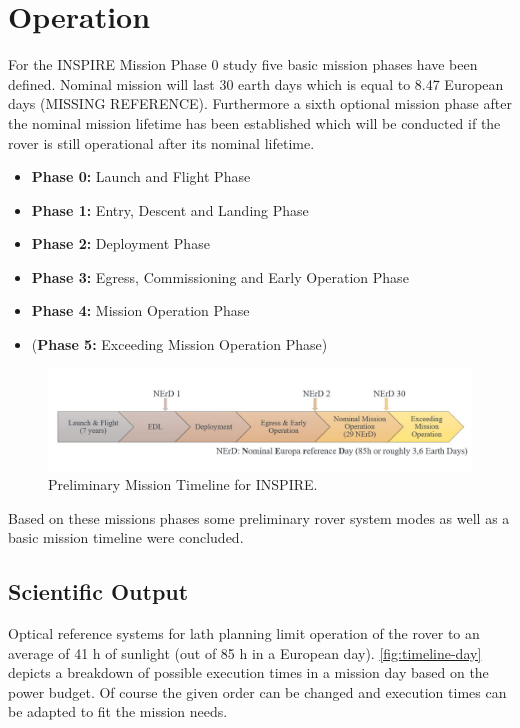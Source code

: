 \chapter{Operation}
\label{chap:Operation}

For the INSPIRE Mission Phase 0 study five basic mission phases have been defined. Nominal mission will last 30 earth days which is equal to 8.47 European days (MISSING REFERENCE). Furthermore a sixth optional mission phase after the nominal mission lifetime has been established which will be conducted if the rover is still operational after its nominal lifetime.

\begin{itemize}
\itemsep0pt
\item	\textbf{Phase 0:} Launch and Flight Phase
\item	\textbf{Phase 1:} Entry, Descent and Landing Phase
\item	\textbf{Phase 2:} Deployment Phase
\item	\textbf{Phase 3:} Egress, Commissioning and Early Operation Phase
\item	\textbf{Phase 4:} Mission Operation Phase
\item	(\textbf{Phase 5:} Exceeding Mission Operation Phase) 
\end{itemize}

\begin{figure}[H]
{\centering
\includegraphics[width=1.0\textwidth]{Media/timeline}
\caption{Preliminary Mission Timeline for INSPIRE.}
\label{fig:timeline}
}
\end{figure}

Based on these missions phases some preliminary rover system modes as well as a basic mission timeline were concluded.

\section{Scientific Output}
\label{chap:sc-output}

Optical reference systems for lath planning limit operation of the rover to an average of 41 h of sunlight (out of 85 h in a European day). \autoref{fig:timeline-day} depicts a breakdown of possible execution times in a mission day based on the power budget. Of course the given order can be changed and execution times can be adapted to fit the mission needs. \\

